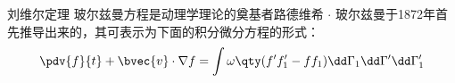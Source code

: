 
刘维尔定理
玻尔兹曼方程是动理学理论的奠基者路德维希 $\cdot$ 玻尔兹曼于1872年首先推导出来的，其可表示为下面的积分微分方程的形式：
\begin{equation}
\pdv{f}{t}+\bvec{v}\cdot\nabla f=\int\omega\qty(f'f_1'-ff_1)\dd\Gamma_1\dd\Gamma'\dd\Gamma_1'
\end{equation}
